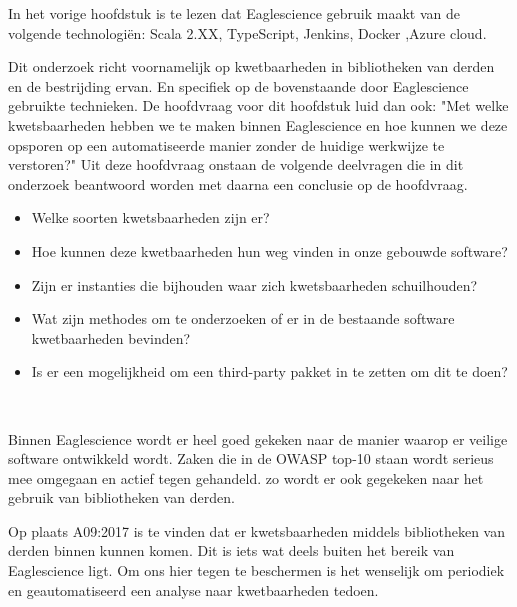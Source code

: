 



In het vorige hoofdstuk is te lezen dat Eaglescience gebruik maakt van de volgende technologi\"en: Scala 2.XX, TypeScript, Jenkins, Docker ,Azure cloud.

Dit onderzoek richt voornamelijk op kwetbaarheden in bibliotheken  van derden en de bestrijding ervan.
En specifiek op de bovenstaande door Eaglescience gebruikte technieken.
De hoofdvraag voor dit hoofdstuk luid dan ook: "Met welke kwetsbaarheden hebben we te maken binnen Eaglescience en hoe kunnen we deze opsporen op een automatiseerde manier zonder de huidige werkwijze te verstoren?" Uit deze hoofdvraag onstaan de volgende deelvragen die in dit onderzoek beantwoord worden met daarna een conclusie op de hoofdvraag.

\begin{itemize}
\item Welke soorten kwetsbaarheden zijn er?
\item Hoe kunnen deze kwetbaarheden hun weg vinden in onze gebouwde software?
\item Zijn er instanties die bijhouden waar zich kwetsbaarheden schuilhouden?
\item Wat zijn methodes om te onderzoeken of er in de bestaande software kwetbaarheden bevinden?
\item Is er een mogelijkheid om een third-party pakket in te zetten om dit te doen?
\end{itemize}

\

Binnen Eaglescience wordt er heel goed gekeken naar de manier waarop er veilige software ontwikkeld wordt.
Zaken die in de OWASP top-10 staan wordt serieus mee omgegaan en actief tegen gehandeld. zo wordt er ook gegekeken naar het gebruik van bibliotheken van derden.

Op plaats A09:2017 is te vinden dat er kwetsbaarheden middels bibliotheken van derden binnen kunnen komen. Dit is iets wat deels buiten het bereik van Eaglescience ligt. Om ons hier tegen te beschermen is het wenselijk om periodiek en geautomatiseerd een analyse naar kwetbaarheden tedoen.

